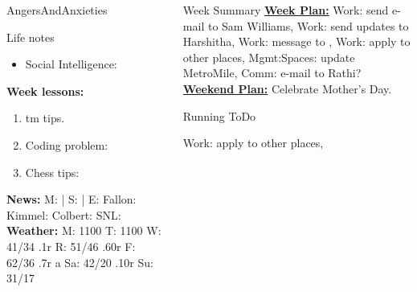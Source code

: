 \begin{columns}
\begin{column}{0.10\linewidth}
\begin{block}{AngersAndAnxieties}
\begin{itemize}
      \end{itemize}
    \end{block}
      \begin{block}{Life notes}
        \begin{itemize}
          \tiny \item \tiny Social Intelligence: 
        \end{itemize}
      \end{block}
      \begin{block}
        {\tiny {\bf Week lessons:}}
        \begin{enumerate}
        \item \tiny tm tips. 
        \item \tiny Coding problem:
        \item \tiny Chess tips: 
        \end{enumerate}
            {{\tiny {\tiny \bf  News:}} {\tiny  M:  | S: 
                | E: Fallon:  Kimmel:  Colbert: SNL:}}
            {{\tiny {\tiny \bf  Weather:}} {\tiny M: 1100 T: 1100 W: 41/34 .1r 
                 R: 51/46 .60r F: 62/36 .7r a Sa: 42/20 .10r Su: 31/17 }}
      \end{block}
  \end{column}
  \begin{column}{0.6\linewidth}
    \begin{block}{Week Summary} 
      {\underline {\bf Week Plan:} 
        Work: send e-mail to Sam Williams, 
        Work: send updates to Harshitha, Work: message to , 
        Work: apply to other places, 
        Mgmt:Spaces: update MetroMile, Comm: e-mail to Rathi? 
      }\\ 
      {\underline{\bf Weekend Plan:} Celebrate Mother's Day. } \\
  
    \end{block}
    \begin{block}{Running ToDo} %
      \item \tiny Work: apply to other places, 
        

\end{block}
\end{column}
\end{columns}

